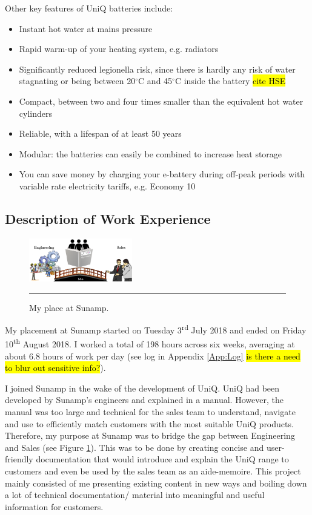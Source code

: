 Other key features of UniQ batteries include:
\begin{itemize}
	\item Instant hot water at mains pressure
	\item Rapid warm-up of your heating system, e.g. radiators
	\item Significantly reduced legionella risk, since there is hardly any risk of water stagnating or being between 20$^{\circ}$C and 45$^{\circ}$C inside the battery \hl{cite HSE}
	\item Compact, between two and four times smaller than the equivalent hot water cylinders
	\item Reliable, with a lifespan of at least 50 years
	\item Modular: the batteries can easily be combined to increase heat storage
	\item You can save money by charging your e-battery during off-peak periods with variable rate electricity tariffs, e.g. Economy 10
\end{itemize}



\newpage
\subsection*{Description of Work Experience}

\begin{figure}
	\includegraphics[width=0.4\textwidth]{figures/bridge.png}
	\rule{0.4\textwidth}{0.5pt} %
	\caption{My place at Sunamp.}
	\label{fig:bridge}
\end{figure}

My placement at Sunamp started on Tuesday 3\textsuperscript{rd} July 2018 and ended on Friday 10\textsuperscript{th} August 2018.
I worked a total of 198 hours across six weeks, averaging at about 6.8 hours of work per day (see log in Appendix \ref{App:Log} \hl{is there a need to blur out sensitive info?}).

I joined Sunamp in the wake of the development of UniQ.
UniQ had been developed by Sunamp's engineers and explained in a manual.
However, the manual was too large and technical for the sales team to understand, navigate and use to efficiently match customers with the most suitable UniQ products.
Therefore, my purpose at Sunamp was to bridge the gap between Engineering and Sales (see Figure \ref{fig:bridge}).
This was to be done by creating concise and user-friendly documentation that would introduce and explain the UniQ range to customers and even be used by the sales team as an aide-memoire.
This project mainly consisted of me presenting existing content in new ways and boiling down a lot of technical documentation/ material into meaningful and useful information for customers.

